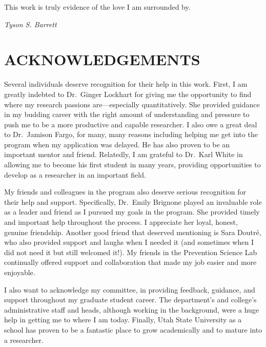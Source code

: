 \documentclass[]{DissertateUSU}
\begin{document}
This work is truly evidence of the love I am surrounded by.

\hspace{10.5 cm} \emph{Tyson S. Barrett}

\newpage

 \fancyhead[R]{\thepage} \fancyfoot[C]{}
\chapter*{ACKNOWLEDGEMENTS}

Several individuals deserve recognition for their help in this work.
First, I am greatly indebted to Dr.~Ginger Lockhart for giving me the
opportunity to find where my research passions are---especially
quantitatively. She provided guidance in my budding career with the
right amount of understanding and pressure to push me to be a more
productive and capable researcher. I also owe a great deal to
Dr.~Jamison Fargo, for many, many reasons including helping me get into
the program when my application was delayed. He has also proven to be an
important mentor and friend. Relatedly, I am grateful to Dr.~Karl White
in allowing me to become his first student in many years, providing
opportunities to develop as a researcher in an important field.

My friends and colleagues in the program also deserve serious
recognition for their help and support. Specifically, Dr.~Emily Brignone
played an invaluable role as a leader and friend as I pursued my goals
in the program. She provided timely and important help throughout the
process. I appreciate her loyal, honest, genuine friendship. Another
good friend that deserved mentioning is Sara Doutré, who also provided
support and laughs when I needed it (and sometimes when I did not need
it but still welcomed it!). My friends in the Prevention Science Lab
continually offered support and collaboration that made my job easier
and more enjoyable.

I also want to acknowledge my committee, in providing feedback,
guidance, and support throughout my graduate student career. The
department's and college's administrative staff and heads, although
working in the background, were a huge help in getting me to where I am
today. Finally, Utah State University as a school has proven to be a
fantastic place to grow academically and to mature into a researcher.

\newpage

 \fancyhead[R]{\thepage} \fancyfoot[C]{}
\tableofcontents
\end{document}

